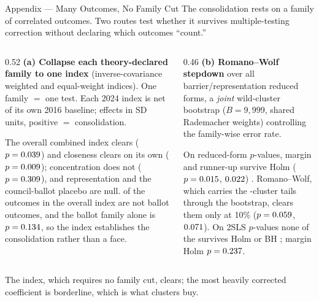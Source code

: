
\begin{frame}{Appendix --- Many Outcomes, No Family Cut}
\hypertarget{app:multiplicity}{}
\footnotesize
The consolidation rests on a family of correlated outcomes. Two routes test whether it survives multiple-testing correction without declaring which outcomes ``count.''
\vspace{-2pt}

\begin{columns}[T]
\begin{column}{0.52\linewidth}
\scriptsize \textbf{(a) Collapse each theory-declared family to one index} (inverse-covariance weighted  and equal-weight  indices). One family $=$ one test. Each 2024 index is net of its own 2016 baseline; effects in SD units, positive $=$ consolidation.
\vspace{-4pt}
\begin{center}
\scriptsize
\scalebox{0.95}{\resizebox{\linewidth}{!}{}}
\end{center}
\scriptsize The overall combined index clears ($p=0.039$) and closeness clears on its own ($p=0.009$); concentration does not ($p=0.309$), and representation and the council-ballot placebo are null. \IdxNonBallotK{} of the \IdxOverallK{} outcomes in the overall index are not ballot outcomes, and the ballot family alone is $p=0.134$, so the index establishes the consolidation rather than a face.
\end{column}
\begin{column}{0.46\linewidth}
\scriptsize \textbf{(b) Romano--Wolf stepdown}  over all \RWFamilyN{} barrier/representation reduced forms, a \emph{joint} wild-cluster bootstrap ($B=9{,}999$, shared Rademacher weights) controlling the family-wise error rate.
\vspace{-4pt}
\begin{center}
\scriptsize
\scalebox{0.95}{\resizebox{\linewidth}{!}{}}
\end{center}
\scriptsize On reduced-form $p$-values, margin and runner-up survive Holm ($p=0.015$, $0.022$) . Romano--Wolf, which carries the \ARNClusters{}-cluster tails through the bootstrap, clears them only at 10\% ($p=0.059$, $0.071$). On 2SLS $p$-values none of the \MultFamilyN{} survives Holm or BH ; margin Holm $p=0.237$.
\end{column}
\end{columns}
\vspace{2pt}
\footnotesize The index, which requires no family cut, clears; the most heavily corrected coefficient is borderline, which is what \ARNClusters{} clusters buy.  \hfill\hyperlink{src:spine1}{}
\end{frame}
